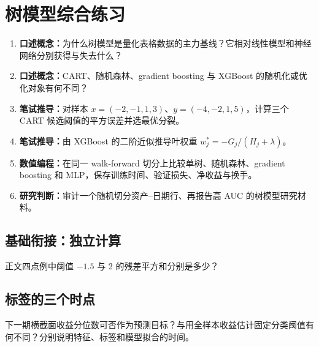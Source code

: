 \section{树模型综合练习}
\begin{enumerate}[leftmargin=*]
  \item \textbf{口述概念：}为什么树模型是量化表格数据的主力基线？它相对线性模型和神经网络分别获得与失去什么？
  \item \textbf{口述概念：}CART、随机森林、gradient boosting 与 XGBoost 的随机化或优化对象有何不同？
  \item \textbf{笔试推导：}对样本 $x=(-2,-1,1,3)$、$y=(-4,-2,1,5)$，计算三个 CART 候选阈值的平方误差并选最优分裂。
  \item \textbf{笔试推导：}由 XGBoost 的二阶近似推导叶权重 $w_j^*=-G_j/(H_j+\lambda)$。
  \item \textbf{数值编程：}在同一 walk-forward 切分上比较单树、随机森林、gradient boosting 和 MLP，保存训练时间、验证损失、净收益与换手。
  \item \textbf{研究判断：}审计一个随机切分资产--日期行、再报告高 AUC 的树模型研究材料。
\end{enumerate}

\subsection*{基础衔接：独立计算}
正文四点例中阈值 $-1.5$ 与 2 的残差平方和分别是多少？

\subsection*{标签的三个时点}
下一期横截面收益分位数可否作为预测目标？与用全样本收益估计固定分类阈值有何不同？分别说明特征、标签和模型拟合的时间。
